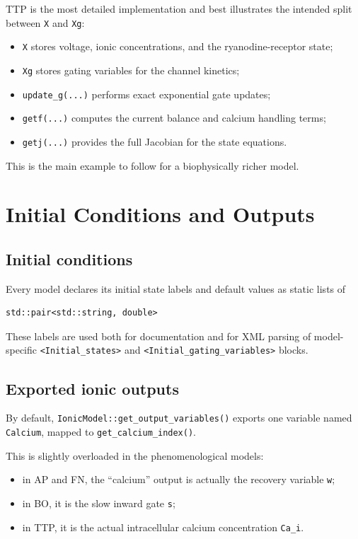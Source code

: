 \documentclass[11pt]{article}
\begin{document}
TTP is the most detailed implementation and best illustrates the intended split between \texttt{X} and \texttt{Xg}:
\begin{itemize}[leftmargin=*]
\item \texttt{X} stores voltage, ionic concentrations, and the ryanodine-receptor state;
\item \texttt{Xg} stores gating variables for the channel kinetics;
\item \texttt{update\_g(...)} performs exact exponential gate updates;
\item \texttt{getf(...)} computes the current balance and calcium handling terms;
\item \texttt{getj(...)} provides the full Jacobian for the state equations.
\end{itemize}

This is the main example to follow for a biophysically richer model.

\section{Initial Conditions and Outputs}

\subsection{Initial conditions}

Every model declares its initial state labels and default values as static lists of
\begin{verbatim}
std::pair<std::string, double>
\end{verbatim}
These labels are used both for documentation and for XML parsing of model-specific
\texttt{<Initial\_states>} and \texttt{<Initial\_gating\_variables>} blocks.

\subsection{Exported ionic outputs}

By default, \texttt{IonicModel::get\_output\_variables()} exports one variable named \texttt{Calcium}, mapped to \texttt{get\_calcium\_index()}.

This is slightly overloaded in the phenomenological models:
\begin{itemize}[leftmargin=*]
\item in AP and FN, the ``calcium'' output is actually the recovery variable \texttt{w};
\item in BO, it is the slow inward gate \texttt{s};
\item in TTP, it is the actual intracellular calcium concentration \texttt{Ca\_i}.
\end{itemize}
\end{document}
